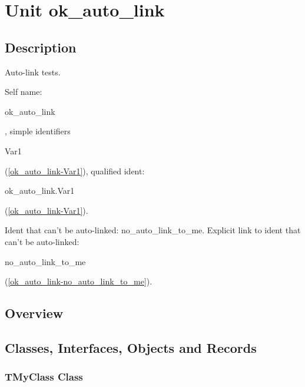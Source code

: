 \documentclass{report}
\newif\ifpdf
\begin{document}
\label{toc}\tableofcontents
\newpage
\newlength{\tmplength}
\chapter{Unit ok{\_}auto{\_}link}
\label{ok_auto_link}
\section{Description}
Auto{-}link tests.\hfill\vspace*{1ex}



Self name: \begin{ttfamily}ok{\_}auto{\_}link\end{ttfamily}, simple identifiers \begin{ttfamily}Var1\end{ttfamily}(\ref{ok_auto_link-Var1}), qualified ident: \begin{ttfamily}ok{\_}auto{\_}link.Var1\end{ttfamily}(\ref{ok_auto_link-Var1}).

Ident that can't be auto{-}linked: no{\_}auto{\_}link{\_}to{\_}me. Explicit link to ident that can't be auto{-}linked: \begin{ttfamily}no{\_}auto{\_}link{\_}to{\_}me\end{ttfamily}(\ref{ok_auto_link-no_auto_link_to_me}).
\section{Overview}
\begin{description}
\item[\texttt{\begin{ttfamily}TMyClass\end{ttfamily} Class}]
\end{description}
\section{Classes, Interfaces, Objects and Records}
\ifpdf
\subsection*{\large{\textbf{TMyClass Class}}\normalsize\hspace{1ex}\hrulefill}
\else
\subsection*{TMyClass Class}
\fi
\label{ok_auto_link.TMyClass}
\end{document}
